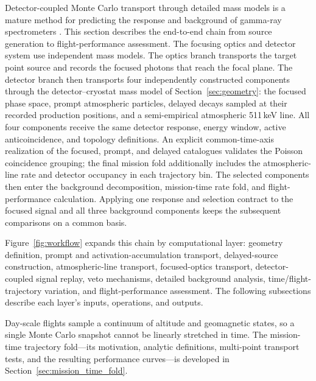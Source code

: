 \documentclass[11pt]{article}
\begin{document}
Detector-coupled Monte Carlo transport through detailed mass models is a mature method for predicting the response and background of gamma-ray spectrometers \cite{Sturner2003}. This section describes the end-to-end chain from source generation to flight-performance assessment. The focusing optics and detector system use independent mass models. The optics branch transports the target point source and records the focused photons that reach the focal plane. The detector branch then transports four independently constructed components through the detector--cryostat mass model of Section~\ref{sec:geometry}: the focused phase space, prompt atmospheric particles, delayed decays sampled at their recorded production positions, and a semi-empirical atmospheric 511\,keV line. All four components receive the same detector response, energy window, active anticoincidence, and topology definitions. An explicit common-time-axis realization of the focused, prompt, and delayed catalogues validates the Poisson coincidence grouping; the final mission fold additionally includes the atmospheric-line rate and detector occupancy in each trajectory bin. The selected components then enter the background decomposition, mission-time rate fold, and flight-performance calculation. Applying one response and selection contract to the focused signal and all three background components keeps the subsequent comparisons on a common basis.

Figure~\ref{fig:workflow} expands this chain by computational layer: geometry definition, prompt and activation-accumulation transport, delayed-source construction, atmospheric-line transport, focused-optics transport, detector-coupled signal replay, veto mechanisms, detailed background analysis, time/flight-trajectory variation, and flight-performance assessment. The following subsections describe each layer's inputs, operations, and outputs.

Day-scale flights sample a continuum of altitude and geomagnetic states, so a single Monte Carlo snapshot cannot be linearly stretched in time. The mission-time trajectory fold---its motivation, analytic definitions, multi-point transport tests, and the resulting performance curves---is developed in Section~\ref{sec:mission_time_fold}.
\end{document}
